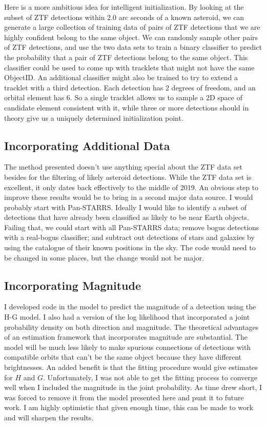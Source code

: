 Here is a more ambitious idea for intelligent initialization.
By looking at the subset of ZTF detections within 2.0 arc seconds of a known asteroid, we can generate a large collection of training data
of pairs of ZTF detections that we are highly confident belong to the same object.
We can randomly sample other pairs of ZTF detections, and use the two data sets to train a binary classifier to predict 
the probability that a pair of ZTF detections belong to the same object.
This classifier could be used to come up with tracklets that might not have the same ObjectID.
An additional classifier might also be trained to try to extend a tracklet with a third detection.
Each detection has 2 degrees of freedom, and an orbital element has 6.
So a single tracklet allows us to sample a 2D space of candidate element consistent with it,
while three or more detections should in theory give us a uniquely determined initialization point.

\subsection{Incorporating Additional Data}
The method presented doesn't use anything special about the ZTF data set besides for the filtering of likely asteroid detections.
While the ZTF data set is excellent, it only dates back effectively to the middle of 2019.
An obvious step to improve these results would be to bring in a second major data source.
I would probably start with Pan-STARRS.
Ideally I would like to identify a subset of detections that have already been classified as likely to be near Earth objects.
Failing that, we could start with all Pan-STARRS data; remove bogus detections with a real-bogus classifier;
and subtract out detections of stars and galaxies by using the catalogue of their known positions in the sky.
The code would need to be changed in some places, but the change would not be major.

\subsection{Incorporating Magnitude}
I developed code in the  model to predict the magnitude of a detection using the H-G model.
I also had a version of the log likelihood that incorporated a joint probability density on both direction and magnitude.
The theoretical advantages of an estimation framework that incorporates magnitude are substantial.
The model will be much less likely to make spurious connections of detections with compatible orbits
that can't be the same object because they have different brightnesses.
An added benefit is that the fitting procedure would give estimates for $H$ and $G$.
Unfortunately, I was not able to get the fitting process to converge well when I included the magnitude in the joint probability.
As time drew short, I was forced to remove it from the model presented here and punt it to future work.
I am highly optimistic that given enough time, this can be made to work and will sharpen the results.

